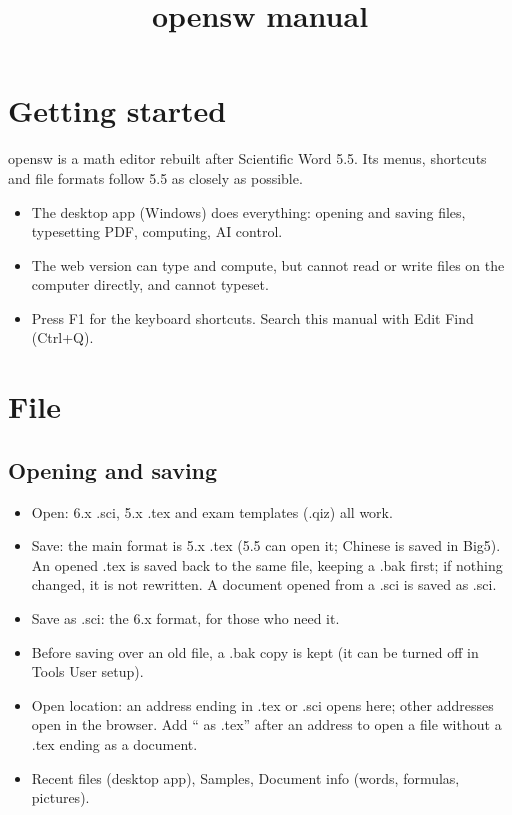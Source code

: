 \title{opensw manual}
\maketitle

\section{Getting started}

opensw is a math editor rebuilt after Scientific Word 5.5. Its menus, shortcuts and file formats follow 5.5 as closely as possible.

\begin{itemize}
\item The desktop app (Windows) does everything: opening and saving files, typesetting PDF, computing, AI control.
\item The web version can type and compute, but cannot read or write files on the computer directly, and cannot typeset.
\item Press F1 for the keyboard shortcuts. Search this manual with Edit \TEXTsymbol{>} Find (Ctrl+Q).
\end{itemize}

\section{File}

\subsection{Opening and saving}

\begin{itemize}
\item Open: 6.x .sci, 5.x .tex and exam templates (.qiz) all work.
\item Save: the main format is 5.x .tex (5.5 can open it; Chinese is saved in Big5). An opened .tex is saved back to the same file, keeping a .bak first; if nothing changed, it is not rewritten. A document opened from a .sci is saved as .sci.
\item Save as .sci: the 6.x format, for those who need it.
\item Before saving over an old file, a .bak copy is kept (it can be turned off in Tools \TEXTsymbol{>} User setup).
\item Open location: an address ending in .tex or .sci opens here; other addresses open in the browser. Add `` as .tex'' after an address to open a file without a .tex ending as a document.
\item Recent files (desktop app), Samples, Document info (words, formulas, pictures).
\end{itemize}

